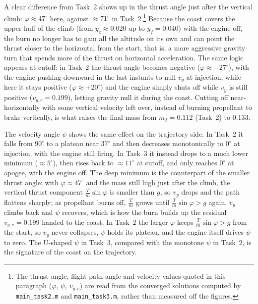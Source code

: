 \documentclass[../main.tex]{subfiles}
\begin{document}
A clear difference from Task~2 shows up in the thrust angle just after the vertical climb: $\varphi \approx 47^\circ$ here, against $\approx 71^\circ$ in Task~2.\footnote{The thrust-angle, flight-path-angle and velocity values quoted in this paragraph ($\varphi$, $\psi$, $v_{y,c}$) are read from the converged solutions computed by \texttt{main\_task2.m} and \texttt{main\_task3.m}, rather than measured off the figures.} Because the coast covers the upper half of the climb (from $y_c \approx 0.020$ up to $y_f = 0.040$) with the engine off, the burn no longer has to gain all the altitude on its own and can point the thrust closer to the horizontal from the start, that is, a more aggressive gravity turn that spends more of the thrust on horizontal acceleration. The same logic appears at cutoff: in Task~2 the thrust angle becomes negative ($\varphi \approx -27^\circ$), with the engine pushing downward in the last instants to null $v_y$ at injection, while here it stays positive ($\varphi \approx +20^\circ$) and the engine simply shuts off while $v_y$ is still positive ($v_{y,c} = 0.199$), letting gravity null it during the coast. Cutting off near-horizontally with some vertical velocity left over, instead of burning propellant to brake vertically, is what raises the final mass from $m_f = 0.112$ (Task~2) to $0.133$.

The velocity angle $\psi$ shows the same effect on the trajectory side. In Task~2 it falls from $90^\circ$ to a plateau near $37^\circ$ and then decreases monotonically to $0^\circ$ at injection, with the engine still firing. In Task~3 it instead drops to a much lower minimum ($\approx 5^\circ$), then rises back to $\approx 11^\circ$ at cutoff, and only reaches $0^\circ$ at apogee, with the engine off. The deep minimum is the counterpart of the smaller thrust angle: with $\varphi \approx 47^\circ$ and the mass still high just after the climb, the vertical thrust component $\tfrac{T}{m}\sin\varphi$ is smaller than $g$, so $v_y$ drops and the path flattens sharply; as propellant burns off, $\tfrac{T}{m}$ grows until $\tfrac{T}{m}\sin\varphi > g$ again, $v_y$ climbs back and $\psi$ recovers, which is how the burn builds up the residual $v_{y,c} = 0.199$ handed to the coast. In Task~2 the larger $\varphi$ keeps $\tfrac{T}{m}\sin\varphi > g$ from the start, so $v_y$ never collapses, $\psi$ holds its plateau, and the engine itself drives $\psi$ to zero. The U-shaped $\psi$ in Task~3, compared with the monotone $\psi$ in Task~2, is the signature of the coast on the trajectory.
\end{document}
